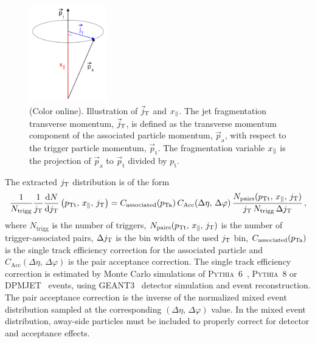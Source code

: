   \begin{figure}
    \begin{center}
      \includegraphics[width = 0.30\textwidth]{figures/jtwithrightangle}
    \end{center}
    \caption{(Color online). Illustration of $\vec{j}_{\rm T}$ and $x_{\parallel}$. The jet fragmentation transverse momentum, $\vec{j}_{\rm T}$, is defined as the transverse momentum component of the associated particle momentum, $\vec{p}_{\mathrm{a}}$, with respect to the trigger particle momentum, $\vec{p}_{\mathrm{t}}$. The fragmentation variable $x_{\parallel}$ is the projection of $\vec{p}_{\mathrm{a}}$ to $\vec{p}_{\mathrm{t}}$ divided by $p_{\mathrm{t}}$.}
    \label{fig:jtdefinition}
  \end{figure}

The extracted $j_{\rm T}$ distribution is of the form
\begin{equation}
  \frac{1}{N_{\mathrm{trigg}}} \frac{1}{j_{\rm T}} \frac{\mathrm{d}N}{\mathrm{d}j_{\rm T}} \left(p_{\rm Tt},\,x_{\parallel},\,j_{\rm T}\right)= C_{\mathrm{associated}}(p_{\rm Ta}) \, C_{\mathrm{Acc}}(\Delta\eta,\,\Delta\varphi) \, \frac{N_{\mathrm{pairs}}(p_{\rm Tt},\,x_{\parallel},\,j_{\rm T}) }{j_{\rm T} \, N_{\mathrm{trigg}} \, \Delta j_{\rm T}} \,,
  \label{eq:exactDistribution}
\end{equation}
where $N_{\mathrm{trigg}}$ is the number of triggers, $N_{\mathrm{pairs}}(p_{\rm Tt},\,x_{\parallel},\,j_{\rm T})$ is the number of trigger-associated pairs, $\Delta j_{\rm T}$ is the bin width of the used $j_{\rm T}$ bin, $C_{\mathrm{associated}}(p_{\rm Ta})$ is the single track efficiency correction for the associated particle and $C_{\mathrm{Acc}}(\Delta\eta,\,\Delta\varphi)$ is the pair acceptance correction. The single track efficiency correction is estimated by Monte Carlo simulations of \textsc{Pythia}~6~\cite{pythiaBig}, \textsc{Pythia}~8 or DPMJET~\cite{dpmjet} events, using GEANT3~\cite{geant} detector simulation and event reconstruction. The pair acceptance correction is the inverse of the normalized mixed event distribution sampled at the corresponding $(\Delta\eta,\,\Delta\varphi)$ value. In the mixed event distribution, away-side particles must be included to properly correct for detector and acceptance effects.

